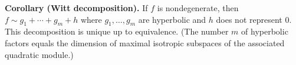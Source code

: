 \textbf{Corollary (Witt decomposition).} If $f$ is nondegenerate, then $f \sim g_1 + \cdots + g_m + h$ where $g_1, \ldots, g_m$ are hyperbolic and $h$ does not represent $0$. This decomposition is unique up to equivalence. (The number $m$ of hyperbolic factors equals the dimension of maximal isotropic subspaces of the associated quadratic module.)
